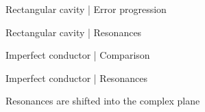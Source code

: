 \documentclass{beamer}
\begin{document}
\begin{frame}{Rectangular cavity | Error progression}

    \begin{figure}
        \centering
        \scalebox{0.8}{}
    \end{figure}

\end{frame}

\begin{frame}{Rectangular cavity | Resonances}

    \begin{figure}
        \centering
        \scalebox{0.8}{}
    \end{figure}

\end{frame}

\begin{frame}{Imperfect conductor | Comparison}

    \begin{figure}
        \centering
        \scalebox{0.8}{}
    \end{figure}

\end{frame}

\begin{frame}{Imperfect conductor | Resonances}

    Resonances are shifted into the complex plane
    \begin{figure}
        \centering
        \scalebox{0.8}{}
    \end{figure}

\end{frame}
\end{document}
